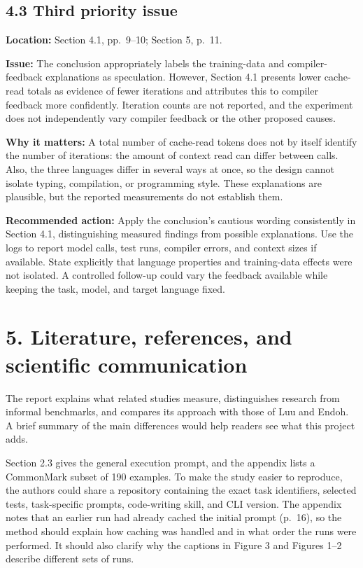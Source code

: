 \documentclass[11pt,a4paper]{extarticle}
\newcommand{\response}[1]{%
  {\color{responsegray}\fontsize{10.5}{11.8}\selectfont #1\par}\vspace{5pt}%
}
\begin{document}
\subsection*{4.3 Third priority issue}
\response{\textbf{Location:} Section 4.1, pp.~9--10; Section 5, p.~11.}
\response{\textbf{Issue:} The conclusion appropriately labels the training-data and compiler-feedback explanations as speculation. However, Section 4.1 presents lower cache-read totals as evidence of fewer iterations and attributes this to compiler feedback more confidently. Iteration counts are not reported, and the experiment does not independently vary compiler feedback or the other proposed causes.}
\response{\textbf{Why it matters:} A total number of cache-read tokens does not by itself identify the number of iterations: the amount of context read can differ between calls. Also, the three languages differ in several ways at once, so the design cannot isolate typing, compilation, or programming style. These explanations are plausible, but the reported measurements do not establish them.}
\response{\textbf{Recommended action:} Apply the conclusion's cautious wording consistently in Section 4.1, distinguishing measured findings from possible explanations. Use the logs to report model calls, test runs, compiler errors, and context sizes if available. State explicitly that language properties and training-data effects were not isolated. A controlled follow-up could vary the feedback available while keeping the task, model, and target language fixed.}

\section*{5. Literature, references, and scientific communication}
\response{The report explains what related studies measure, distinguishes research from informal benchmarks, and compares its approach with those of Luu and Endoh. A brief summary of the main differences would help readers see what this project adds.}

\response{Section 2.3 gives the general execution prompt, and the appendix lists a CommonMark subset of 190 examples. To make the study easier to reproduce, the authors could share a repository containing the exact task identifiers, selected tests, task-specific prompts, code-writing skill, and CLI version. The appendix notes that an earlier run had already cached the initial prompt (p.~16), so the method should explain how caching was handled and in what order the runs were performed. It should also clarify why the captions in Figure 3 and Figures 1--2 describe different sets of runs.}
\end{document}
